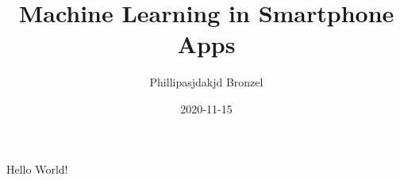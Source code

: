 \documentclass{article}
\title{Machine Learning in Smartphone Apps}
\date{2020-11-15}
\author{Phillipasjdakjd Bronzel}
\begin{document}
  \maketitle
  \newpage
  \tableofcontents
  \newpage

  Hello World!
\end{document}
